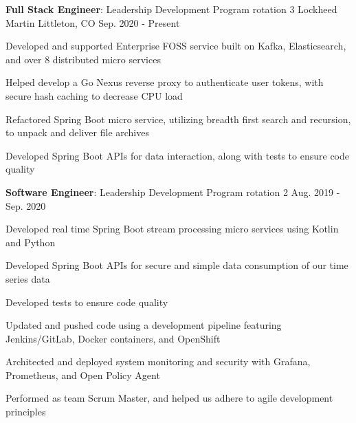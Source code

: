 


\begin{cventries}

\vspace{-.25em}
\cventry
{\textbf{Full Stack Engineer}: Leadership Development Program rotation 3} %
{Lockheed Martin} %
{Littleton, CO} %
{Sep. 2020 - Present} %
{ %
\begin{cvitems}
\item {Developed and supported Enterprise FOSS service built on Kafka, Elasticsearch, and over 8 distributed micro services}
\item {Helped develop a Go Nexus reverse proxy to authenticate user tokens, with secure hash caching to decrease CPU load}
\item {Refactored Spring Boot micro service, utilizing breadth first search and recursion, to unpack and deliver file archives}
\item {Developed Spring Boot APIs for data interaction, along with tests to ensure code quality}
\end{cvitems}
}


\vspace{-1.25em}
\cventry
{\textbf{Software Engineer}: Leadership Development Program rotation 2} %
{} %
{} %
{Aug. 2019 - Sep. 2020} %
{ %
\begin{cvitems}
\item {Developed real time Spring Boot stream processing micro services using Kotlin and Python}
\item {Developed Spring Boot APIs for secure and simple data consumption of our time series data}
\item {Developed tests to ensure code quality}
\item {Updated and pushed code using a development pipeline featuring Jenkins/GitLab, Docker containers, and OpenShift}
\item {Architected and deployed system monitoring and security with Grafana, Prometheus, and Open Policy Agent}
\item {Performed as team Scrum Master, and helped us adhere to agile development principles}
\end{cvitems}
}


\end{cventries}
